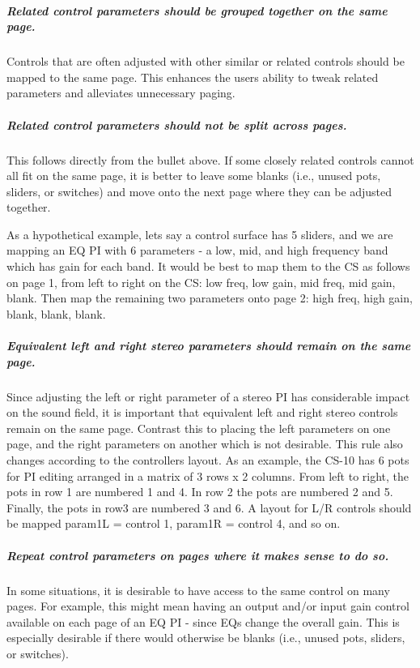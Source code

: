 \subparagraph*{Related control parameters should be grouped together on the same page.}

  Controls that are often \textquotesingle{}adjusted\textquotesingle{} with other similar or related controls should be mapped to the same page. This enhances the users ability to tweak related parameters and alleviates unnecessary paging. 

\subparagraph*{Related control parameters should not be split across pages.}

  This follows directly from the bullet above. If some closely related controls cannot all fit on the same page, it is better to leave some blanks (i.\+e., unused pots, sliders, or switches) and move onto the next page where they can be adjusted together.

 As a hypothetical example, let\textquotesingle{}s say a control surface has 5 sliders, and we are mapping an EQ PI with 6 parameters -\/ a low, mid, and high frequency band which has gain for each band. It would be best to map them to the CS as follows on page 1, from left to right on the CS\+: low freq, low gain, mid freq, mid gain, blank. Then map the remaining two parameters onto page 2\+: high freq, high gain, blank, blank, blank. 

\subparagraph*{Equivalent left and right stereo parameters should remain on the same page.}

  Since adjusting the left or right parameter of a stereo PI has considerable impact on the sound field, it is important that equivalent left and right stereo controls remain on the same page. Contrast this to placing the left parameters on one page, and the right parameters on another which is not desirable. This rule also changes according to the controller\textquotesingle{}s layout. As an example, the C\+S-\/10 has 6 pots for PI editing arranged in a matrix of 3 rows x 2 columns. From left to right, the pots in row 1 are numbered 1 and 4. In row 2 the pots are numbered 2 and 5. Finally, the pots in row3 are numbered 3 and 6. A layout for L/R controls should be mapped param1L = control 1, param1R = control 4, and so on. 

\subparagraph*{Repeat control parameters on pages where it makes sense to do so.}

  In some situations, it is desirable to have access to the same control on many pages. For example, this might mean having an output and/or input gain control available on each page of an EQ PI -\/ since E\+Qs change the overall gain. This is especially desirable if there would otherwise be blanks (i.\+e., unused pots, sliders, or switches). 



